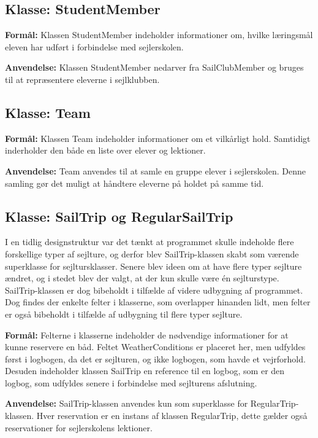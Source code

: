 \subsection*{Klasse: StudentMember}
\textbf{Formål:}
Klassen StudentMember indeholder informationer om, hvilke læringsmål eleven har udført i forbindelse med sejlerskolen. 

\textbf{Anvendelse:}
Klassen StudentMember nedarver fra SailClubMember og bruges til at repræsentere eleverne i sejlklubben.

\subsection*{Klasse: Team}

\textbf{Formål:}
Klassen Team indeholder informationer om et vilkårligt hold. 
Samtidigt inderholder den både en liste over elever og lektioner.

\textbf{Anvendelse:}
Team anvendes til at samle en gruppe elever i sejlerskolen.
Denne samling gør det muligt at håndtere eleverne på holdet på samme tid.

\subsection*{Klasse: SailTrip og RegularSailTrip}

I en tidlig designstruktur var det tænkt at programmet skulle indeholde flere forskellige typer af sejlture, og derfor blev SailTrip-klassen skabt som værende superklasse for sejltursklasser. 
Senere blev ideen om at have flere typer sejlture ændret, og i stedet blev der valgt, at der kun skulle være én sejlturstype. 
SailTrip-klassen er dog bibeholdt i tilfælde af videre udbygning af programmet.
Dog findes der enkelte felter i klasserne, som overlapper hinanden lidt, men felter er også bibeholdt i tilfælde af udbygning til flere typer sejlture.

\textbf{Formål:}
Felterne i klasserne indeholder de nødvendige informationer for at kunne reservere en båd.
Feltet WeatherConditions er placeret her, men udfyldes først i logbogen, da det er sejlturen, og ikke logbogen, som havde et vejrforhold.
Desuden indeholder klassen SailTrip en reference til en logbog, som er den logbog, som udfyldes senere i forbindelse med sejlturens afslutning.

\textbf{Anvendelse:}
SailTrip-klassen anvendes kun som superklasse for RegularTrip-klassen. 
Hver reservation er en instans af klassen RegularTrip, dette gælder også reservationer for sejlerskolens lektioner.

